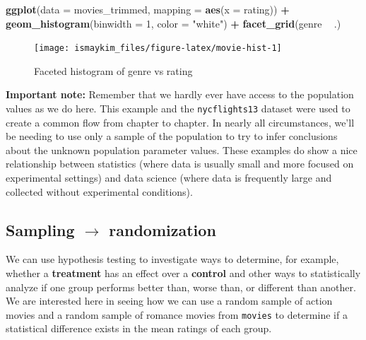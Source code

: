 \documentclass[12pt, krantz2,]{krantz}
\makeatletter
\newenvironment{Shaded}{\begin{snugshade}}{\end{snugshade}}
\newcommand{\DataTypeTok}[1]{\textcolor[rgb]{0.27,0.27,0.27}{#1}}
\newcommand{\DecValTok}[1]{\textcolor[rgb]{0.06,0.06,0.06}{#1}}
\newcommand{\KeywordTok}[1]{\textcolor[rgb]{0.27,0.27,0.27}{\textbf{#1}}}
\newcommand{\NormalTok}[1]{#1}
\newcommand{\OperatorTok}[1]{\textcolor[rgb]{0.43,0.43,0.43}{\textbf{#1}}}
\newcommand{\StringTok}[1]{\textcolor[rgb]{0.5,0.5,0.5}{#1}}
\newenvironment{kframe}{%
\medskip{}
\setlength{\fboxsep}{.8em}
 \def\at@end@of@kframe{}%
 \ifinner\ifhmode%
  \def\at@end@of@kframe{\end{minipage}}%
  \begin{minipage}{\columnwidth}%
 \fi\fi%
 \def\FrameCommand##1{\hskip\@totalleftmargin \hskip-\fboxsep
 \colorbox{shadecolor}{##1}\hskip-\fboxsep
     \hskip-\linewidth \hskip-\@totalleftmargin \hskip\columnwidth}%
 \MakeFramed {\advance\hsize-\width
   \@totalleftmargin\z@ \linewidth\hsize
   \@setminipage}}%
 {\par\unskip\endMakeFramed%
 \at@end@of@kframe}
\renewenvironment{Shaded}{\begin{kframe}}{\end{kframe}}
\makeatother
\begin{document}
\begin{Shaded}
\begin{Highlighting}[]
\KeywordTok{ggplot}\NormalTok{(}\DataTypeTok{data =}\NormalTok{ movies_trimmed, }\DataTypeTok{mapping =} \KeywordTok{aes}\NormalTok{(}\DataTypeTok{x =}\NormalTok{ rating)) }\OperatorTok{+}
\StringTok{  }\KeywordTok{geom_histogram}\NormalTok{(}\DataTypeTok{binwidth =} \DecValTok{1}\NormalTok{, }\DataTypeTok{color =} \StringTok{"white"}\NormalTok{) }\OperatorTok{+}
\StringTok{  }\KeywordTok{facet_grid}\NormalTok{(genre }\OperatorTok{~}\StringTok{ }\NormalTok{.)}
\end{Highlighting}
\end{Shaded}

\begin{figure}

{\centering \texttt{[image: ismaykim\_files/figure-latex/movie-hist-1]} 

}

\caption{Faceted histogram of genre vs rating}\label{fig:movie-hist}
\end{figure}

\textbf{Important note:} Remember that we hardly ever have access to the population values as we do here. This example and the \texttt{nycflights13} dataset were used to create a common flow from chapter to chapter. In nearly all circumstances, we'll be needing to use only a sample of the population to try to infer conclusions about the unknown population parameter values. These examples do show a nice relationship between statistics (where data is usually small and more focused on experimental settings) and data science (where data is frequently large and collected without experimental conditions).

\hypertarget{sampling-rightarrow-randomization}{%
\subsection{\texorpdfstring{Sampling \(\rightarrow\) randomization}{Sampling \textbackslash{}rightarrow randomization}}\label{sampling-rightarrow-randomization}}

We can use hypothesis testing to investigate ways to determine, for example, whether a \textbf{treatment} has an effect over a \textbf{control} and other ways to statistically analyze if one group performs better than, worse than, or different than another. We are interested here in seeing how we can use a random sample of action movies and a random sample of romance movies from \texttt{movies} to determine if a statistical difference exists in the mean ratings of each group.
\end{document}
